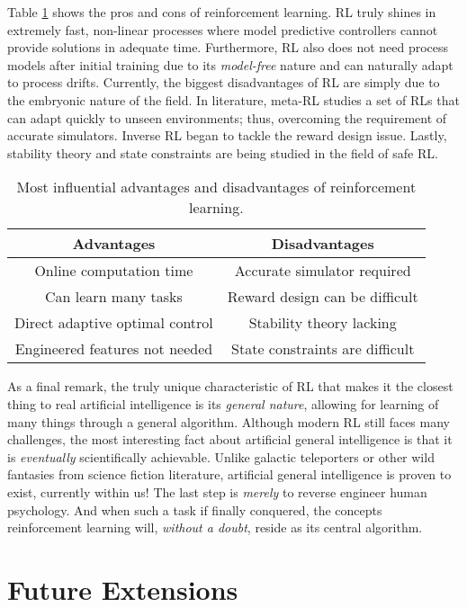 Table \ref{tab:06adv_disadv} shows the pros and cons of reinforcement learning. RL truly shines in extremely fast, non-linear processes where model predictive controllers cannot provide solutions in adequate time.  Furthermore, RL also does not need process models after initial training due to its \textit{model-free} nature and can naturally adapt to process drifts. Currently, the biggest disadvantages of RL are simply due to the embryonic nature of the field. In literature, meta-RL studies a set of RLs that can adapt quickly to unseen environments; thus, overcoming the requirement of accurate simulators.  Inverse RL began to tackle the reward design issue. Lastly, stability theory and state constraints are being studied in the field of safe RL. 

\begin{table}[H]
\caption{Most influential advantages and disadvantages of reinforcement learning.}
\centering
\begin{tabular}{c|c}
\textbf{Advantages}	& \textbf{Disadvantages}\\ \hline
Online computation time  & Accurate simulator required			 \\
Can learn many tasks	   & Reward design can be difficult		 \\
Direct adaptive optimal control       & Stability theory lacking    \\
Engineered features not needed & State constraints are difficult \\
\end{tabular}
\label{tab:06adv_disadv}
\end{table}

As a final remark, the truly unique characteristic of RL that makes it the closest thing to real artificial intelligence is its \textit{general nature}, allowing for learning of many things through a general algorithm. Although modern RL still faces many challenges, the most interesting fact about artificial general intelligence is that it is \textit{eventually} scientifically achievable. Unlike galactic teleporters or other wild fantasies from science fiction literature, artificial general intelligence is proven to exist, currently within us!  The last step is \textit{merely} to reverse engineer human psychology. And when such a task if finally conquered, the concepts reinforcement learning will, \textit{without a doubt}, reside as its central algorithm.

\section{Future Extensions}

